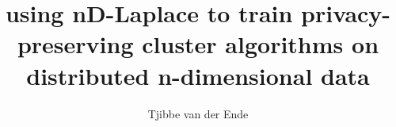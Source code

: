 \documentclass{ou-report}
\begin{document}
\pagestyle{plain}
\title{using nD-Laplace to train privacy-preserving cluster algorithms on distributed n-dimensional data}
\author{Tjibbe van der Ende}
%



\frontmatter
\renewcommand{\algorithmicrequire}{\textbf{Input:}}
\renewcommand{\algorithmicensure}{\textbf{Output:}}
\let\cleardoublepage\clearpage

%

%
\tableofcontents



%
%


\mainmatter
{}







\newpage

%

%

%

%

%



\backmatter
{}





%  
%  
%  

\printglossaries

\appendix


\end{document}
